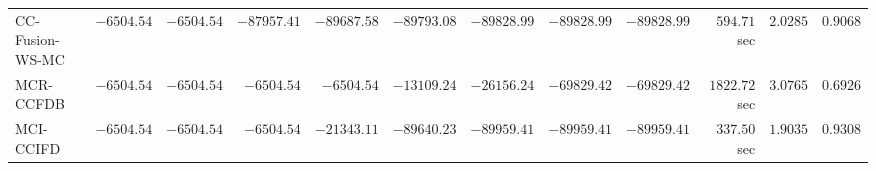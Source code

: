 \begin{table}[H]
\begin{tabular}{lrrrrrrrrrrr}
     CC-Fusion-WS-MC & $     -6504.54$ & $     -6504.54$ & $    -87957.41$ & $    -89687.58$ & $    -89793.08$ & $    -89828.99$ & $    -89828.99$ & $    -89828.99$ & $       594.71$ sec    & $       2.0285$  & $       0.9068$ \\ 
\cmidrule{1-1} 
           MCR-CCFDB & $     -6504.54$ & $     -6504.54$ & $     -6504.54$ & $     -6504.54$ & $    -13109.24$ & $    -26156.24$ & $    -69829.42$ & $    -69829.42$ & $      1822.72$ sec    & $       3.0765$  & $       0.6926$ \\ 
\cmidrule{1-1} 
           MCI-CCIFD & $     -6504.54$ & $     -6504.54$ & $     -6504.54$ & $    -21343.11$ & $    -89640.23$ & $    -89959.41$ & $    -89959.41$ & $    -89959.41$ & $       337.50$ sec    & $       1.9035$  & $       0.9308$ \\ 
\bottomrule
\end{tabular}
\end{table}

